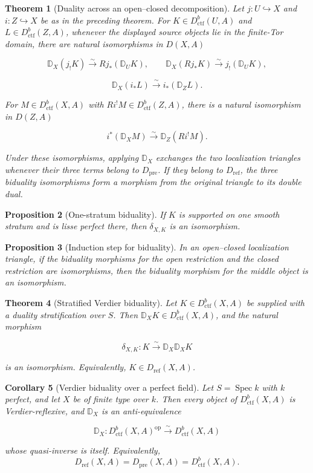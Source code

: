 \documentclass[10pt]{article}
\newtheorem{theorem}{Theorem}[section]
\newtheorem{proposition}[theorem]{Proposition}
\newtheorem{corollary}[theorem]{Corollary}
\theoremstyle{definition}
\newcommand{\Dctf}{D^b_{\mathrm{ctf}}}
\newcommand{\DD}{\mathbb D}
\begin{document}
\begin{theorem}[Duality across an open--closed decomposition]
\label{thm:open-closed-exchange}
Let \(j:U\hookrightarrow X\) and \(i:Z\hookrightarrow X\) be as in the
preceding theorem.  For \(K\in\Dctf(U,A)\) and \(L\in\Dctf(Z,A)\), whenever
the displayed source objects lie in the finite-Tor domain, there are natural
isomorphisms in \(D(X,A)\)

\[
 \DD_X(j_!K)\xrightarrow{\sim}Rj_*(\DD_UK),
 \qquad
 \DD_X(Rj_*K)\xrightarrow{\sim}j_!(\DD_UK),
\]

\[
 \DD_X(i_*L)\xrightarrow{\sim}i_*(\DD_ZL).
\]

For \(M\in\Dctf(X,A)\) with \(Ri^!M\in\Dctf(Z,A)\), there is a natural
isomorphism in \(D(Z,A)\)

\[
 i^*(\DD_XM)\xrightarrow{\sim}\DD_Z(Ri^!M).
\]

Under these isomorphisms, applying \(\DD_X\) exchanges the two localization
triangles whenever their three terms belong to \(D_{\mathrm{pre}}\).  If
they belong to \(D_{\mathrm{ref}}\), the three biduality isomorphisms form a
morphism from the original triangle to its double dual.
\end{theorem}

\begin{proposition}[One-stratum biduality]
If \(K\) is supported on one smooth stratum and is lisse perfect there, then
\(\delta_{X,K}\) is an isomorphism.
\end{proposition}

\begin{proposition}[Induction step for biduality]
In an open--closed localization triangle, if the biduality morphisms for the
open restriction and the closed restriction are isomorphisms, then the
biduality morphism for the middle object is an isomorphism.
\end{proposition}

\begin{theorem}[Stratified Verdier biduality]
Let \(K\in\Dctf(X,A)\) be supplied with a duality stratification over \(S\).
Then \(\DD_XK\in\Dctf(X,A)\), and the natural morphism

\[
 \delta_{X,K}:K\xrightarrow{\sim}\DD_X\DD_XK
\]

is an isomorphism.  Equivalently, \(K\in D_{\mathrm{ref}}(X,A)\).
\end{theorem}

\begin{corollary}[Verdier biduality over a perfect field]
Let \(S=\operatorname{Spec}k\) with \(k\) perfect, and let \(X\) be of finite
type over \(k\).  Then every object of \(\Dctf(X,A)\) is Verdier-reflexive,
and \(\DD_X\) is an anti-equivalence

\[
 \DD_X:\Dctf(X,A)^{\mathrm{op}}\xrightarrow{\sim}\Dctf(X,A)
\]

whose quasi-inverse is itself.
Equivalently,
\[
 D_{\mathrm{ref}}(X,A)=D_{\mathrm{pre}}(X,A)=\Dctf(X,A).
\]
\end{corollary}
\end{document}
